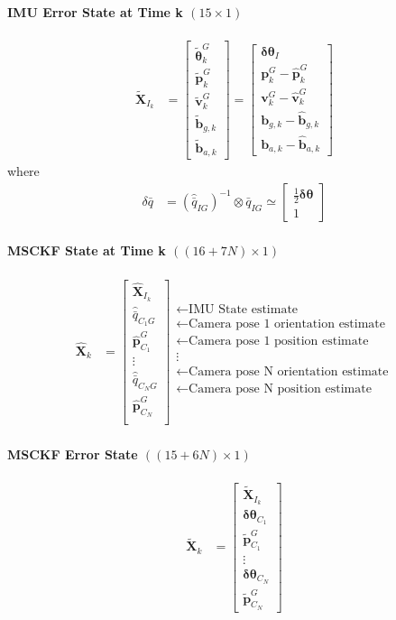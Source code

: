 \documentclass[10pt,letterpaper,fleqn,oneside]{article}
\newcommand{\nl}{\\[0.5em]}
\def\Vec#1{\mathbf{#1}} %
\newcommand{\bbm}{\begin{bmatrix}}
\newcommand{\ebm}{\end{bmatrix}}
\begin{document}
\paragraph{IMU Error State at Time k $(15\times1)$}
\begin{align}
\widetilde{\Vec{X}}_{I_k} &= 	\bbm \widetilde{\boldsymbol{\theta}}^G_k \nl
										\widetilde{\Vec{p}}^G_k \nl
										\widetilde{\Vec{v}}^G_k \nl
										\widetilde{\Vec{b}}_{g,k} \nl
										\widetilde{\Vec{b}}_{a,k}
								\ebm
								=
								\bbm
										\boldsymbol{\delta\theta}_I \nl
										\Vec{p}^G_k - \hat{\Vec{p}}^G_k \nl
										\Vec{v}^G_k - \hat{\Vec{v}}^G_k \nl
										\Vec{b}_{g,k} - \hat{\Vec{b}}_{g,k} \nl
										\Vec{b}_{a,k} - \hat{\Vec{b}}_{a,k} 
								\ebm
\end{align}
where
\begin{align}
\delta\bar{q} &= \left(\hat{\bar{q}}_{I G}\right)^{-1} \otimes \bar{q}_{I G} \simeq \bbm \frac{1}{2}\boldsymbol{\delta\theta} \nl 1 \ebm
\end{align}

\paragraph{MSCKF State at Time k $((16+7N)\times1)$}
\begin{align}
\hat{\Vec{X}}_k &= \bbm	\hat{\Vec{X}}_{I_k} \nl
										\hat{\bar{q}}_{C_1 G} \nl
										\hat{\Vec{p}}^G_{C_1} \nl
										\vdots \nl
										\hat{\bar{q}}_{C_N G} \nl
										\hat{\Vec{p}}^G_{C_N} \nl										
								\ebm
								\begin{array}{l}
								\leftarrow \text{IMU State estimate} \nl
								\leftarrow \text{Camera pose 1 orientation estimate} \nl
								\leftarrow \text{Camera pose 1 position estimate} \nl
								\vdots \nl
								\leftarrow \text{Camera pose N orientation estimate} \nl
								\leftarrow \text{Camera pose N position estimate} \nl
								\end{array}		
\end{align}

\paragraph{MSCKF Error State $((15 + 6N) \times 1)$}
\begin{align}
\widetilde{\Vec{X}}_k &= \bbm	\widetilde{\Vec{X}}_{I_k} \nl
											\boldsymbol{\delta\theta}_{C_1} \nl
											\widetilde{\Vec{p}}^G_{C_1} \nl
											\vdots \nl
											\boldsymbol{\delta\theta}_{C_N} \nl
											\widetilde{\Vec{p}}^G_{C_N}
								\ebm
\end{align}
\end{document}
